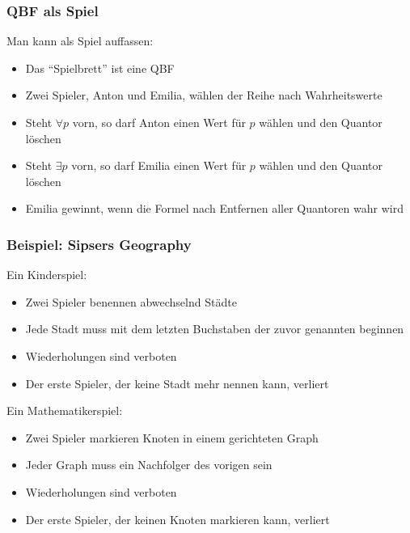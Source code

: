 \documentclass[also={handout}]{beamerswitch}
\begin{document}
\begin{frame}\frametitle{QBF als Spiel}

Man kann  als Spiel auffassen:
\begin{itemize}
\item Das "`Spielbrett"' ist eine QBF
\item Zwei Spieler, \alert{Anton} und \alert{Emilia}, wählen der Reihe nach Wahrheitswerte
\item Steht $\forall p$ vorn, so darf Anton einen Wert für $p$ wählen und den Quantor löschen
\item Steht $\exists p$ vorn, so darf Emilia einen Wert für $p$ wählen und den Quantor löschen
\item Emilia gewinnt, wenn die Formel nach Entfernen aller Quantoren wahr wird
\end{itemize}\bigskip\pause


\end{frame}

\begin{frame}\frametitle{Beispiel: Sipsers Geography}

\alert{Ein Kinderspiel:}
\begin{itemize}
\item Zwei Spieler benennen abwechselnd Städte
\item Jede Stadt muss mit dem letzten Buchstaben der zuvor genannten beginnen
\item Wiederholungen sind verboten
\item Der erste Spieler, der keine Stadt mehr nennen kann, verliert
\end{itemize}
\smallskip

\pause
\alert{Ein Mathematikerspiel:}
\begin{itemize}
\item Zwei Spieler markieren Knoten in einem gerichteten Graph
\item Jeder Graph muss ein Nachfolger des vorigen sein
\item Wiederholungen sind verboten
\item Der erste Spieler, der keinen Knoten markieren kann, verliert
\end{itemize}
\smallskip\pause

{}

\end{frame}
\end{document}
